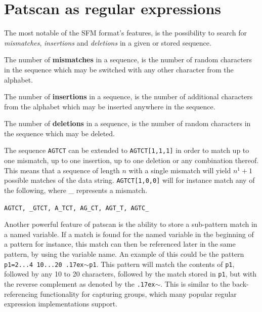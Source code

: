 \documentclass[12pt]{article}
\theoremstyle{definition}
\begin{document}
\section{Patscan as regular expressions}

The most notable of the SFM format's features, is the possibility to search for \textit{mismatches}, \textit{insertions} and \textit{deletions} in a given or stored sequence. 

\begin{definition}
	The number of \textbf{mismatches} in a sequence, is the number of random characters in the sequence which may be switched with any other character from the alphabet.
\end{definition}

\begin{definition}
	The number of \textbf{insertions} in a sequence, is the number of additional characters from the alphabet which may be inserted anywhere in the sequence.
\end{definition}

\begin{definition}
	The number of \textbf{deletions} in a sequence, is the number of random characters in the sequence which may be deleted.
\end{definition}

The sequence \texttt{AGTCT} can be extended to \texttt{AGTCT[1,1,1]} in order to match up to one mismatch, up to one insertion, up to one deletion or any combination thereof. This means that a sequence of length $n$ with a single mismatch will yield $n^1+1$ possible matches of the data string. \texttt{AGTCT[1,0,0]} will for instance match any of the following, where \_ represents a mismatch.

\texttt{AGTCT, \_GTCT, A\_TCT, AG\_CT, AGT\_T, AGTC\_}

Another powerful feature of patscan is the ability to store a sub-pattern match in a named variable. If a match is found for the named variable in the beginning of a pattern for instance, this match can then be referenced later in the same pattern, by using the variable name. An example of this could be the pattern \texttt{p1=2...4 10...20 {\raise.17ex\hbox{$\scriptstyle\mathtt{\sim}$}}p1}. This pattern will match the contents of \texttt{p1}, followed by any 10 to 20 characters, followed by the match stored in \texttt{p1}, but with the reverse complement as denoted by the \texttt{{\raise.17ex\hbox{$\scriptstyle\mathtt{\sim}$}}}. This is similar to the back-referencing functionality for capturing groups, which many popular regular expression implementations support.%
\end{document}
